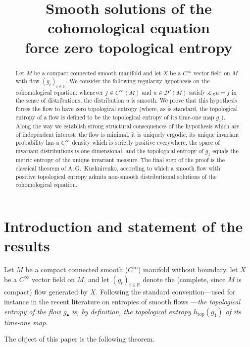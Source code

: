 \documentclass[11pt]{amsart}
\theoremstyle{plain}
\theoremstyle{definition}
\theoremstyle{remark}
\newcommand{\Dp}{\mathcal{D}'}
\newcommand{\R}{\mathbb{R}}
\newcommand{\Lx}{\mathcal{L}_X}
\begin{document}
\title{Smooth solutions of the cohomological equation\\ force zero topological entropy}

\author{}
\date{}

\begin{abstract}
Let $M$ be a compact connected smooth manifold and let $X$ be a $C^\infty$
vector field on $M$ with flow $(g_t)_{t\in\R}$. We consider the following
regularity hypothesis on the cohomological equation: whenever
$f\in C^\infty(M)$ and $u\in\Dp(M)$ satisfy $\Lx u=f$ in the sense of
distributions, the distribution $u$ is smooth. We prove that this
hypothesis forces the flow to have zero topological entropy (where, as
is standard, the topological entropy of a flow is defined to be the
topological entropy of its time-one map $g_1$). Along the way we
establish strong structural consequences of the hypothesis which are of
independent interest: the flow is minimal, it is uniquely ergodic, its
unique invariant probability has a $C^\infty$ density which is strictly
positive everywhere, the space of invariant distributions is one
dimensional, and the topological entropy of $g_1$ equals the metric
entropy of the unique invariant measure. The final step of the proof is
the classical theorem of A.\,G.~Kushnirenko, according to which a smooth
flow with positive topological entropy admits non-smooth distributional
solutions of the cohomological equation.
\end{abstract}

\maketitle

\section{Introduction and statement of the results}

Let $M$ be a compact connected smooth ($C^\infty$) manifold without
boundary, let $X$ be a $C^\infty$ vector field on $M$, and let
$(g_t)_{t\in\R}$ denote the (complete, since $M$ is compact) flow
generated by $X$. Following the standard convention---used for instance
in the recent literature on entropies of smooth flows
\cite{LWW}---\emph{the topological entropy of the flow
$g_\bullet$ is, by definition, the topological entropy $h_{\mathrm{top}}(g_1)$
of its time-one map.}

The object of this paper is the following theorem.
\end{document}
